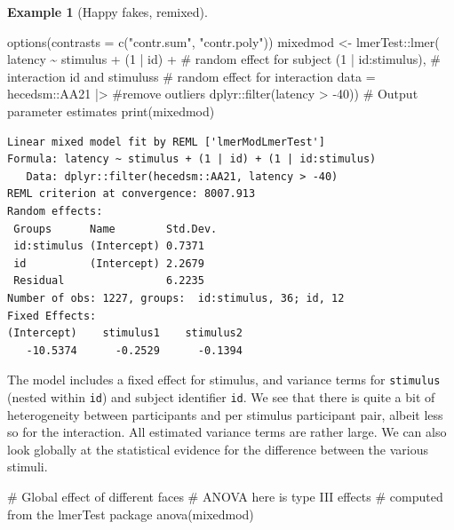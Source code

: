 \documentclass[
  11pt,
  letterpaper,
]{scrbook}
\newenvironment{Shaded}{\begin{snugshade}}{\end{snugshade}}
\newcommand{\AttributeTok}[1]{\textcolor[rgb]{0.40,0.45,0.13}{#1}}
\newcommand{\CommentTok}[1]{\textcolor[rgb]{0.37,0.37,0.37}{#1}}
\newcommand{\DecValTok}[1]{\textcolor[rgb]{0.68,0.00,0.00}{#1}}
\newcommand{\FunctionTok}[1]{\textcolor[rgb]{0.28,0.35,0.67}{#1}}
\newcommand{\NormalTok}[1]{\textcolor[rgb]{0.00,0.23,0.31}{#1}}
\newcommand{\OtherTok}[1]{\textcolor[rgb]{0.00,0.23,0.31}{#1}}
\newcommand{\SpecialCharTok}[1]{\textcolor[rgb]{0.37,0.37,0.37}{#1}}
\newcommand{\StringTok}[1]{\textcolor[rgb]{0.13,0.47,0.30}{#1}}
\theoremstyle{definition}
\newtheorem{example}{Example}[chapter]
\theoremstyle{definition}
\theoremstyle{remark}
\begin{document}
\begin{example}[Happy fakes,
remixed]
\begin{Shaded}
\begin{Highlighting}[]
\FunctionTok{options}\NormalTok{(}\AttributeTok{contrasts =} \FunctionTok{c}\NormalTok{(}\StringTok{"contr.sum"}\NormalTok{, }\StringTok{"contr.poly"}\NormalTok{))}
\NormalTok{mixedmod }\OtherTok{\textless{}{-}}\NormalTok{ lmerTest}\SpecialCharTok{::}\FunctionTok{lmer}\NormalTok{(}
\NormalTok{  latency }\SpecialCharTok{\textasciitilde{}}\NormalTok{ stimulus }\SpecialCharTok{+} 
\NormalTok{    (}\DecValTok{1} \SpecialCharTok{|}\NormalTok{ id) }\SpecialCharTok{+} \CommentTok{\# random effect for subject}
\NormalTok{    (}\DecValTok{1} \SpecialCharTok{|}\NormalTok{ id}\SpecialCharTok{:}\NormalTok{stimulus), }\CommentTok{\# interaction id and stimuluss}
  \CommentTok{\# random effect for interaction }
  \AttributeTok{data =}\NormalTok{ hecedsm}\SpecialCharTok{::}\NormalTok{AA21 }\SpecialCharTok{|\textgreater{}} \CommentTok{\#remove outliers}
\NormalTok{    dplyr}\SpecialCharTok{::}\FunctionTok{filter}\NormalTok{(latency }\SpecialCharTok{\textgreater{}} \SpecialCharTok{{-}}\DecValTok{40}\NormalTok{))}
\CommentTok{\# Output parameter estimates}
\FunctionTok{print}\NormalTok{(mixedmod)}
\end{Highlighting}
\end{Shaded}

\begin{verbatim}
Linear mixed model fit by REML ['lmerModLmerTest']
Formula: latency ~ stimulus + (1 | id) + (1 | id:stimulus)
   Data: dplyr::filter(hecedsm::AA21, latency > -40)
REML criterion at convergence: 8007.913
Random effects:
 Groups      Name        Std.Dev.
 id:stimulus (Intercept) 0.7371  
 id          (Intercept) 2.2679  
 Residual                6.2235  
Number of obs: 1227, groups:  id:stimulus, 36; id, 12
Fixed Effects:
(Intercept)    stimulus1    stimulus2  
   -10.5374      -0.2529      -0.1394  
\end{verbatim}

The model includes a fixed effect for stimulus, and variance terms for
\texttt{stimulus} (nested within \texttt{id}) and subject identifier
\texttt{id}. We see that there is quite a bit of heterogeneity between
participants and per stimulus participant pair, albeit less so for the
interaction. All estimated variance terms are rather large. We can also
look globally at the statistical evidence for the difference between the
various stimuli.

\begin{Shaded}
\begin{Highlighting}[]
\CommentTok{\# Global effect of different faces}
\CommentTok{\# ANOVA here is type III effects }
\CommentTok{\# computed from the \textquotesingle{}lmerTest\textquotesingle{} package}
\FunctionTok{anova}\NormalTok{(mixedmod)}
\end{Highlighting}
\end{Shaded}


\end{example}
\end{document}
